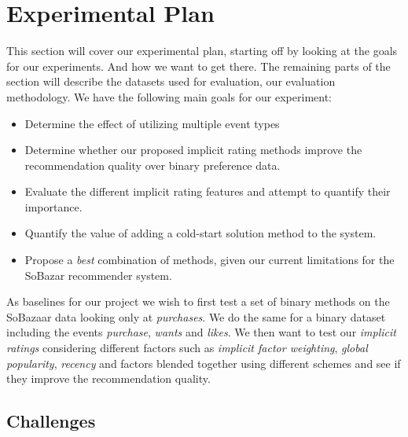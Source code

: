 \clearpage
\section{Experimental Plan}
\label{sec:experimental-plan}


This section will cover our experimental plan, starting off by looking at the
goals for our experiments. And how we want to get there. The remaining parts of
the section will describe the datasets used for evaluation, our evaluation methodology.
We have the following main goals for our experiment:

\begin{itemize}
	\item Determine the effect of utilizing multiple event types
	\item Determine whether our proposed implicit rating methods improve the recommendation quality over
	binary preference data.
	\item Evaluate the different implicit rating features and attempt to quantify their importance.
	\item Quantify the value of adding a cold-start solution method to the system.
	\item Propose a \emph{best} combination of methods, given our current limitations for the SoBazar recommender system.
\end{itemize}

As baselines for our project we wish to first test a set of binary methods on the SoBazaar data
looking only at \emph{purchases}. We do the same for a binary dataset including the events
\emph{purchase}, \emph{wants} and \emph{likes}. We then want to test our \emph{implicit ratings}
considering different factors such as \emph{implicit factor weighting}, \emph{global popularity},
\emph{recency} and factors blended together using different schemes and see if they improve the
recommendation quality.

\subsection{Challenges}

